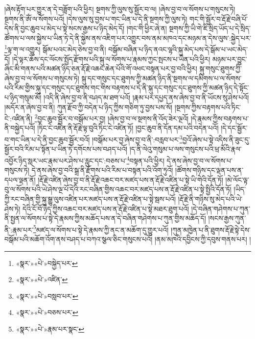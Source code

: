 །ཞེས་རྟོག་པར་གྱུར་ན་དེ་བཟློག་པའི་ཕྱིར། སྔགས་ཀྱི་ལུས་སུ་སྦྱོར་བ་ལ། །ཞེས་བྱ་བ་ལ་སོགས་པ་གསུངས་ཏེ། སྔགས་ནི་ཨོཾ་ལ་སོགས་པའོ། །དེས་ལུས་སུ་བྱས་པ་གང་ཡིན་པ་དེ་ནི་སྔགས་ཀྱི་ལུས་ཏེ། གང་གི་སྦྱོར་བ་རྡོ་རྗེ་བཞི་པོ་དེས་ནི་བྱང་ཆུབ་པ་མེད་པ་སྟེ་སངས་རྒྱས་པ་ཉིད་མེད་དོ། །གང་གི་ཕྱིར་ཞེ་ན། སྔགས་ཀྱི་ཡི་གེ་ཇི་སྲིད་ཡོད་པ་དེ་སྲིད་ཚོགས་པ་ལས་སྐྱེས་པ་ཡིན་ཏེ་དེ་ནི་སྐྱེས་ནས་འཇིག་པར་འགྱུར་བས་ནམ་མཁའ་དང་མཉམ་ན་དེས་ལུས་:སྐྱེད་པར་\footnote{«སྣར་»«པེ་»བསྐྱེད་པར་}ལྟ་ག་ལ་འགྱུར། སྒོམ་པའང་མེད་ཅེས་བྱ་བ་ནི། བསྒོམ་བཞིན་པ་ཉིད་ནའང་ལྷའི་སྐུ་མེད་པས་དེ་སྒོམ་པ་ཡང་མེད་དོ། །དེ་ལྟར་ཆོས་དང་ལོངས་སྤྱོད་རྫོགས་པའི་སྐུ་ལ་སོགས་པ་རྣམས་ཀྱང་སྤངས་པ་ཡིན་པའི་ཕྱིར། མཉམ་པར་བྱུང་ཞིང་མི་གནས་པའི་མཚན་ཉིད་ཅན་རྡོ་རྗེ་འཆང་ཆེན་པོའི་གོ་འཕང་བསྟན་པར་བྱ་བའི་ཕྱིར། སྐུ་གསུང་ཐུགས་ཀྱི་ཞེས་བྱ་བ་ལ་སོགས་པ་གསུངས་ཏེ། སྐུ་དང་གསུང་དང་ཐུགས་ཀྱི་མཚན་ཉིད་ནི་སྔགས་ལ་དམིགས་པ་ལ་སོགས་པའི་རིམ་གྱིས་སྐུ་དང་གསུང་དང་ཐུགས་གང་གིས་བརྟགས་པ་དེ་ནི་སྐུ་དང་གསུང་དང་ཐུགས་ཀྱི་མཚན་ཉིད་དེ་སྟོང་པ་ཉིད་གསུམ་མོ། །འདི་ནི་ཞེས་བྱ་བ་ནི་བཤད་མ་ཐག་པའོ། །རྣམ་པར་དཔྱད་ནས་ཞེས་བྱ་བ་ནི་ཡོངས་སུ་ཤེས་པའོ། །མདོར་ན་ཞེས་བྱ་བ་ནི། ཀུན་རྫོབ་ཀྱི་བདེན་པ་ཉིད་ཀྱིས་གཅིག་ཏུ་བྱས་པས་སོ། །སྔགས་ཀྱིས་བརྟགས་པའི་ཏིང་ངེ་:འཛིན་ནི། \footnote{«སྣར་»«པེ་»འཛིན་}བྱང་ཆུབ་སྦྱོར་བ་བསྒོམ་པར་བྱ། །ཞེས་བྱ་བ་ལ་སྔགས་ནི་འོད་ཟེར་ལྔའོ། །དེ་རྣམས་ཀྱིས་བརྟགས་པ་ནི་བསྐྱེད་པའོ། །ཏིང་ངེ་འཛིན་ནི་རྡོ་རྗེ་ལྟ་བུའི་ཏིང་ངེ་འཛིན་ཏོ། །བྱང་ཆུབ་ནི་དོན་དམ་པའི་བདེན་པའོ། །དེ་དང་སྦྱོར་བ་གང་ཡིན་པ་དེ་ནི་བྱང་ཆུབ་སྦྱོར་བའོ། །བསྒོམ་པར་བྱ་ཞེས་བྱ་བ་ནི་:བརླབ་པར་\footnote{«སྣར་»«པེ་»བསླབ་པར་}བྱའོ་ཞེས་པ་སྟེ་འདིས་ནི་ཟུང་དུ་སྦྱོར་བའི་རིམ་པ་སྟོན་པ་ཡིན་ཏེ་དགོངས་པས་བཤད་པའོ། །ད་ནི་ལེའུ་གསུམ་པ་ལས་གསུངས་པའི་ཕྲ་མོའི་རྣལ་འབྱོར་ཉིད་སླར་ཡང་རྣམ་པར་ཤེས་པ་རླུང་དང་:བཅས་པ་\footnote{«སྣར་»«པེ་»བཅས་པར་}བསྟན་པའི་ཕྱིར། དེ་ནས་ཞེས་བྱ་བ་ལ་སོགས་པ་གསུངས་ཏེ། དེ་ནས་ཞེས་བྱ་བའི་སྒྲ་ནི་རྫོགས་པའི་རིམ་པ་བསྟན་པའི་འོག་ཏུའོ། །ཚོགས་གཉིས་དང་ལྡན་པས་ན་དཔལ་ལྡན་ནོ། །རྡོ་རྗེ་འཛིན་ཞེས་བྱ་བ་ནི་རྡོ་རྗེ་འཆང་བར་མཛད་པས་ན་རྡོ་རྗེ་འཛིན་པ་སྟེ་ཡི་གེའི་དོན་ཏོ། །མེ་ལོང་ལྟ་བུ་ལ་སོགས་པའི་ཡེ་ཤེས་ལྔ་པོ་དེའི་རང་བཞིན་གྱིས་འཆང་བར་མཛད་པས་ན་རྡོ་རྗེ་འཛིན་པ་སྟེ་སྤྱིའི་དོན་ཏོ། །ཡིད་ཀྱི་རང་བཞིན་གྱི་སྐུ་སྒྱུ་ལུས་འཛིན་པར་མཛད་པས་ན་རྡོ་རྗེ་འཛིན་པ་སྟེ་སྦས་པའོ། །རྡོ་རྗེ་ནི་གཉིས་སུ་མེད་པའི་ཡེ་ཤེས་ཏེ། དེའི་ངོ་བོ་ཉིད་ཀྱིས་འཆང་བར་མཛད་པས་ན་རྡོ་རྗེ་འཛིན་པ་སྟེ་མཐར་ཐུག་པའོ། །དེ་བཞིན་གཤེགས་པ་ཀུན་ནི་སྤྱན་ལ་སོགས་པ་སྟེ་དེ་རྣམས་ཀྱིས་མཆོད་པས་ན་དེ་བཞིན་གཤེགས་པ་ཀུན་གྱིས་མཆོད་དོ། །སངས་རྒྱས་ཀུན་ནི་:རྣམ་པར་\footnote{«སྣར་»«པེ་»རྣམ་པར་སྣང་}མཛད་ལ་སོགས་པ་སྟེ་དེ་རྣམས་ཀྱི་ནང་ན་མཆོག་དུ་གྱུར་པའོ། །ཀུན་མཁྱེན་པ་ནི་ཐུགས་རྡོ་རྗེ་སྟེ་དེས་བསྒོམ་པའི་མཆོག་འོག་ནས་བཤད་པ་བཀའ་སྩལ་ཅིང་གསུངས་པའོ། །ནམ་མཁའི་དབྱིངས་ཀྱི་དབུས་གནས་པར། །
